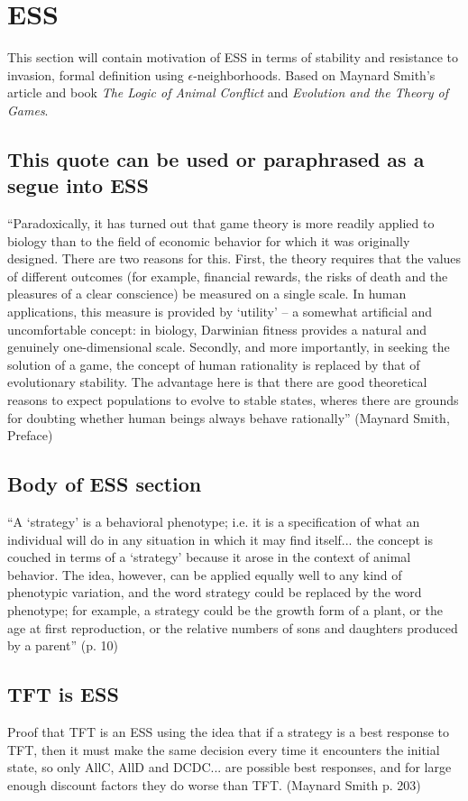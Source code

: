 \chapter{ESS}
This section will contain motivation of ESS in terms of stability and resistance to invasion, formal definition using $\epsilon$-neighborhoods. Based on Maynard Smith's article and book \emph{The Logic of Animal Conflict} and \emph{Evolution and the Theory of Games}.

\section{This quote can be used or paraphrased as a segue into ESS}
``Paradoxically, it has turned out that game theory is more readily applied to biology than to the field of economic behavior for which it was originally designed. There are two reasons for this. First, the theory requires that the values of different outcomes (for example, financial rewards, the risks of death and the pleasures of a clear conscience) be measured on a single scale. In human applications, this measure is provided by `utility' -- a somewhat artificial and uncomfortable concept: in biology, Darwinian fitness provides a natural and genuinely one-dimensional scale. Secondly, and more importantly, in seeking the solution of a game, the concept of human rationality is replaced by that of evolutionary stability. The advantage here is that there are good theoretical reasons to expect populations to evolve to stable states, wheres there are grounds for doubting whether human beings always behave rationally'' (Maynard Smith, Preface)


\section{Body of ESS section}
``A `strategy' is a behavioral phenotype; i.e. it is a specification of what an individual will do in any situation in which it may find itself... the concept is couched in terms of a `strategy' because it arose in the context of animal behavior. The idea, however, can be applied equally well to any kind of phenotypic variation, and the word strategy could be replaced by the word phenotype; for example, a strategy could be the growth form of a plant, or the age at first reproduction, or the relative numbers of sons and daughters produced by a parent'' (p. 10)

\section{TFT is ESS}
Proof that TFT is an ESS using the idea that if a strategy is a best response to TFT, then it must make the same decision every time it encounters the initial state, so only AllC, AllD and DCDC... are possible best responses, and for large enough discount factors they do worse than TFT. (Maynard Smith p. 203)

